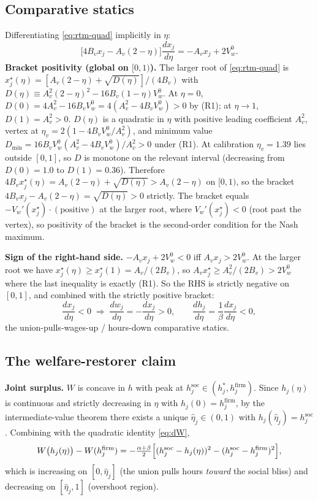 \documentclass[a4paper,11pt]{article}
\begin{document}
\subsection{Comparative statics}
Differentiating \eqref{eq:rtm-quad} implicitly in $\eta$:
\[
\bigl[4B_vx_j-A_v(2-\eta)\bigr]\frac{dx_j}{d\eta}=-A_vx_j+2V_w^{0}.
\]
\textbf{Bracket positivity (global on $[0,1)$).} The larger root of \eqref{eq:rtm-quad} is $x_j^{\star}(\eta)\!=\![A_v(2-\eta)+\sqrt{D(\eta)}]/(4B_v)$ with $D(\eta)\!\equiv\!A_v^{2}(2-\eta)^{2}-16B_v(1-\eta)V_w^{0}$. At $\eta\!=\!0$, $D(0)\!=\!4A_v^{2}-16B_vV_w^{0}\!=\!4(A_v^{2}-4B_vV_w^{0})>0$ by (R1); at $\eta\!\to\!1$, $D(1)\!=\!A_v^{2}\!>\!0$. $D(\eta)$ is a quadratic in $\eta$ with positive leading coefficient $A_v^{2}$, vertex at $\eta_v\!=\!2(1-4B_vV_w^{0}/A_v^{2})$, and minimum value $D_{\min}\!=\!16B_vV_w^{0}(A_v^{2}-4B_vV_w^{0})/A_v^{2}>0$ under (R1). At calibration $\eta_v\!=\!1.39$ lies outside $[0,1]$, so $D$ is monotone on the relevant interval (decreasing from $D(0)\!=\!1.0$ to $D(1)\!=\!0.36$). Therefore $4B_vx_j^{\star}(\eta)\!=\!A_v(2-\eta)+\sqrt{D(\eta)}>A_v(2-\eta)$ on $[0,1)$, so the bracket $4B_vx_j-A_v(2-\eta)\!=\!\sqrt{D(\eta)}>0$ strictly. The bracket equals $-V_w'(x_j^{\star})\cdot(\text{positive})$ at the larger root, where $V_w'(x_j^{\star})\!<\!0$ (root past the vertex), so positivity of the bracket is the second-order condition for the Nash maximum.

\textbf{Sign of the right-hand side.} $-A_vx_j+2V_w^{0}<0$ iff $A_v x_j>2V_w^{0}$. At the larger root we have $x_j^{\star}(\eta)\!\ge\!x_j^{\star}(1)\!=\!A_v/(2B_v)$, so $A_v x_j^{\star}\!\ge\!A_v^{2}/(2B_v)>2V_w^{0}$ where the last inequality is exactly (R1). So the RHS is strictly negative on $[0,1]$, and combined with the strictly positive bracket:
\[
\frac{dx_j}{d\eta}<0\;\Longrightarrow\;\frac{dw_j}{d\eta}=-\frac{dx_j}{d\eta}>0,\qquad \frac{dh_j}{d\eta}=\frac{1}{\beta}\frac{dx_j}{d\eta}<0,
\]
the union-pulls-wages-up / hours-down comparative statics.

\subsection{The welfare-restorer claim}
\textbf{Joint surplus.} $W$ is concave in $h$ with peak at $h^{\mathrm{soc}}_j\in(h^{*}_j,h^{\mathrm{firm}}_j)$. Since $h_j(\eta)$ is continuous and strictly decreasing in $\eta$ with $h_j(0)=h^{\mathrm{firm}}_j$, by the intermediate-value theorem there exists a unique $\hat\eta_j\in(0,1)$ with $h_j(\hat\eta_j)=h^{\mathrm{soc}}_j$. Combining with the quadratic identity \eqref{eq:dW},
\[
W\bigl(h_j(\eta)\bigr)-W(h^{\mathrm{firm}}_j)=-\tfrac{\alpha+\beta}{2}\Bigl[(h^{\mathrm{soc}}_j-h_j(\eta))^{2}-(h^{\mathrm{soc}}_j-h^{\mathrm{firm}}_j)^{2}\Bigr],
\]
which is increasing on $[0,\hat\eta_j]$ (the union pulls hours \emph{toward} the social bliss) and decreasing on $[\hat\eta_j,1]$ (overshoot region).
\end{document}
